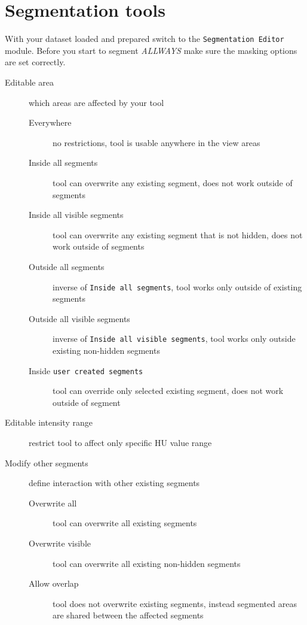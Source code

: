 \section{Segmentation tools}
With your dataset loaded and prepared switch to the \texttt{Segmentation Editor} module.
Before you start to segment \emph{ALLWAYS} make sure the masking options are set correctly.
\begin{description}
	\item [Editable area] which areas are affected by your tool
	      \begin{description}
		      \item [Everywhere] no restrictions, tool is usable anywhere in the view areas
		      \item [Inside all segments] tool can overwrite any existing segment, does not work outside of segments
		      \item [Inside all visible segments] tool can overwrite any existing segment that is not hidden, does not work outside of segments
		      \item [Outside all segments] inverse of \texttt{Inside all segments}, tool works only outside of existing segments
		      \item [Outside all visible segments] inverse of \texttt{Inside all visible segments}, tool works only outside existing non-hidden segments
		      \item [Inside \texttt{user created segments}] tool can override only selected existing segment, does not work outside of segment
	      \end{description}
	\item [Editable intensity range] restrict tool to affect only specific HU value range
	\item [Modify other segments] define interaction with other existing segments
	      \begin{description}
		      \item [Overwrite all] tool can overwrite all existing segments
		      \item [Overwrite visible] tool can overwrite all existing non-hidden segments
		      \item [Allow overlap] tool does not overwrite existing segments, instead segmented areas are shared between the affected segments
	      \end{description}
\end{description}
\pagebreak

